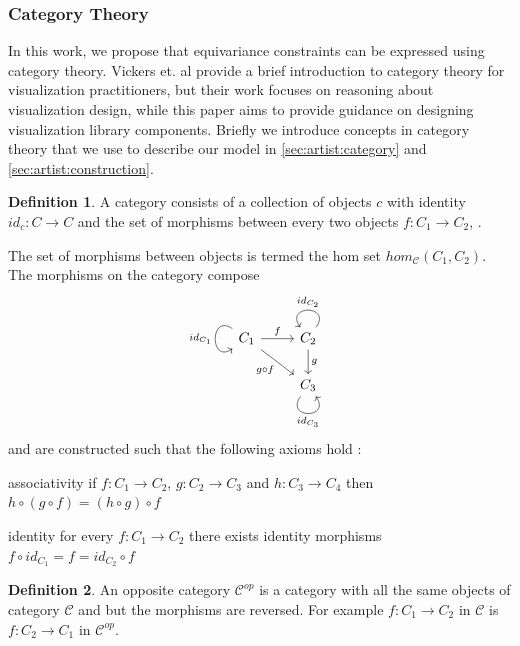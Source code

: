 \documentclass[10pt,journal,compsoc]{IEEEtran}
\theoremstyle{definition}
\newtheorem{definition}{Definition}[section]
\theoremstyle{remark}
\begin{document}
\subsubsection{Category Theory}
\label{sec:related-work:equivariance:category}
In this work, we propose that equivariance constraints can be expressed using category theory. Vickers et. al \cite{vickersUnderstandingVisualizationFormal2013} provide a brief introduction to category theory for visualization practitioners, but their work focuses on reasoning about visualization design, while this paper aims to provide guidance on designing visualization library components. Briefly we introduce concepts in category theory that we use to describe our model in \autoref{sec:artist:category} and \autoref{sec:artist:construction}. 

\begin{definition} A category  consists of a collection of objects $c$ with identity $id_c: C\rightarrow C$ and the set of morphisms between every two objects $f:C_1 \rightarrow C_2$, \cite{fongInvitationAppliedCategory2019,maclaneCategoriesWorkingMathematician2013}. 
\end{definition}
The set of morphisms between objects is termed the hom set $hom_{\mathcal{C}}(C_1, C_2)$. The morphisms on the category  compose
\begin{equation*}
  \begin{tikzcd}
    C_1 \arrow[r, "f"] \arrow[rd, "g\circ f"'] \arrow["id_{C_1}"', loop, distance=2em, in=215, out=145] & C_2 \arrow[d, "g"] \arrow["id_{C_2}"', loop, distance=2em, in=125, out=55] \\
  & C_3 \arrow["id_{C_3}"', loop, distance=2em, in=305, out=235]              
  \end{tikzcd}
\end{equation*}
 and are constructed such that the following axioms hold \cite{riehlCategoryTheoryContext}:
 \begin{LaTeXdescription}
   \item[associativity] if $f: C_1 \rightarrow C_2$, $g: C_2 \rightarrow C_3$ and $h: C_3 \rightarrow C_4$ then $h\circ (g \circ f) = (h \circ g) \circ f$
   \item[identity] for every $f: C_1 \rightarrow C_2$ there exists identity morphisms $f \circ id_{C_1} = f = id_{C_2} \circ f$
 \end{LaTeXdescription}

 \begin{definition} An opposite category $\mathcal{C}^{op}$ is a category with all the same objects of category $\mathcal{C}$ and but the morphisms are reversed. For example $f:C_1 \rightarrow C_2$ in $\mathcal{C}$ is $f:C_2 \rightarrow C_1$ in $\mathcal{C}^{op}$.   
 \end{definition}
\end{document}
